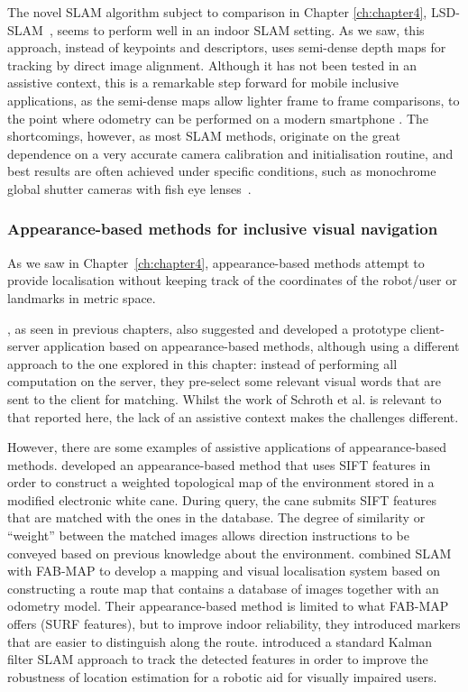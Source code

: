 The novel SLAM algorithm subject to comparison in Chapter \ref{ch:chapter4}, LSD-SLAM~\citep{engel14eccv}, seems to perform well in an indoor SLAM setting. As we saw, this approach, instead of keypoints and descriptors, uses semi-dense depth maps for tracking by direct image alignment. Although it has not been tested in an assistive context, this is a remarkable step forward for mobile inclusive applications, as the semi-dense maps allow lighter frame to frame comparisons, to the point where odometry can be performed on a modern smartphone \citep{schoeps14ismar}. The shortcomings, however, as most SLAM methods, originate on the great dependence on a very accurate camera calibration and initialisation routine, and best results are often achieved under specific conditions, such as monochrome global shutter cameras with fish eye lenses~\citep{engel14eccv}.

\subsubsection{Appearance-based methods for inclusive visual navigation}

As we saw in Chapter~\ref{ch:chapter4}, appearance-based methods attempt to provide localisation without keeping track of the coordinates of the robot/user or landmarks in metric space. 

\citet{schroth2011mobile}, as seen in previous chapters, also suggested and developed a prototype client-server application based on appearance-based methods, although using a different approach to the one explored in this chapter: instead of performing all computation on the server, they pre-select some relevant visual words that are sent to the client for matching. Whilst the work of Schroth et al. is relevant to that reported here, the lack of an assistive context makes the challenges different.

However, there are some examples of assistive applications of appearance-based methods. \citet{ali2010indoor} developed an appearance-based method that uses SIFT features in order to construct a weighted topological map of the environment stored in a modified electronic white cane. During query, the cane submits SIFT features that are matched with the ones in the database. The degree of similarity or ``weight'' between the matched images allows direction instructions to be conveyed based on previous knowledge about the environment. \citet{nguyen2014mapping} combined SLAM with FAB-MAP to develop a mapping and visual localisation system based on constructing a route map that contains a database of images together with an odometry model. Their appearance-based method is limited to what FAB-MAP offers (SURF features), but to improve indoor reliability, they introduced markers that are easier to distinguish along the route. \citet{nguyen2014visual} introduced a standard Kalman filter SLAM approach to track the detected features in order to improve the robustness of location estimation for a robotic aid for visually impaired users.


